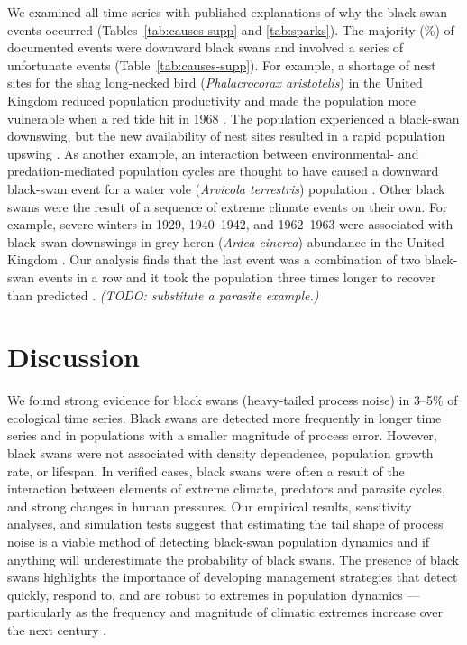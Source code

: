 We examined all time series with published explanations of why the black-swan events occurred (Tables~\ref{tab:causes-supp} and \ref{tab:sparks}). The majority (\percBSDown \%) of documented events were downward black swans and involved a series of unfortunate events (Table~\ref{tab:causes-supp}). For example, a shortage of nest sites for the shag long-necked bird (\textit{Phalacrocorax aristotelis}) in the United Kingdom reduced population productivity and made the population more vulnerable when a red tide hit in 1968 \citep{potts1980}. The population experienced a black-swan downswing, but the new availability of nest sites resulted in a rapid population upswing \citep{potts1980}. As another example, an interaction between environmental- and predation-mediated population cycles are thought to have caused a downward black-swan event for a water vole (\textit{Arvicola terrestris}) population \citep{saucy1994}. Other black swans were the result of a sequence of extreme climate events on their own. For example, severe winters in 1929, 1940--1942, and 1962--1963 were associated with black-swan downswings in grey heron (\textit{Ardea cinerea}) abundance in the United Kingdom \citep{stafford1971}. Our analysis finds that the last event was a combination of two black-swan events in a row and it took the population three times longer to recover than predicted \citep{stafford1971}. \textit{(TODO: substitute a parasite example.)}


\section{Discussion}

We found strong evidence for black swans (heavy-tailed process noise) in 3--5\% of ecological time series. Black swans are detected more frequently in longer time series and in populations with a smaller magnitude of process error. However, black swans were not associated with density dependence, population growth rate, or lifespan. In verified cases, black swans were often a result of the interaction between elements of extreme climate, predators and parasite cycles, and strong changes in human pressures. Our empirical results, sensitivity analyses, and simulation tests suggest that estimating the tail shape of process noise is a viable method of detecting black-swan population dynamics and if anything will underestimate the probability of black swans. The presence of black swans highlights the importance of developing management strategies that detect quickly, respond to, and are robust to extremes in population dynamics --- particularly as the frequency and magnitude of climatic extremes increase over the next century \citep{easterling2000,ipcc2012}.

